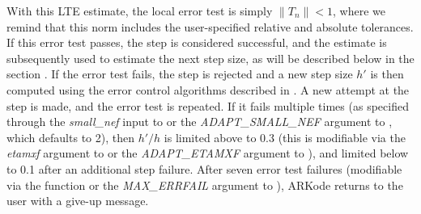 \documentclass[letterpaper,10pt,english]{sphinxmanual}
\begin{document}
With this LTE estimate, the local error test is simply \(\|T_n\|
< 1\), where we remind that this norm includes the user-specified
relative and absolute tolerances.  If this error test passes, the step
is considered successful, and the estimate is subsequently used to
estimate the next step size, as will be described below in the section
{\hyperref[Mathematics:mathematics-adaptivity-errorcontrol]{\emph{}}}.  If the error test fails,
the step is rejected and a new step size \(h'\) is then computed
using the error control algorithms described in
{\hyperref[Mathematics:mathematics-adaptivity-errorcontrol]{\emph{}}}.  A new attempt at the step
is made, and the error test is repeated.  If it fails multiple times
(as specified through the \emph{small\_nef} input to
{\hyperref[c_interface/User_callable:c.ARKodeSetSmallNumEFails]{\emph{}}} or the \emph{ADAPT\_SMALL\_NEF} argument
to {\hyperref[f_interface/Usage:f/_/FARKSETIIN]{\emph{}}}, which defaults to 2), then
\(h'/h\) is limited above to 0.3 (this is modifiable via the
\emph{etamxf} argument to {\hyperref[c_interface/User_callable:c.ARKodeSetMaxEFailGrowth]{\emph{}}} or the
\emph{ADAPT\_ETAMXF} argument to {\hyperref[f_interface/Usage:f/_/FARKSETRIN]{\emph{}}}), and
limited below to 0.1 after an additional step failure.  After
seven error test failures (modifiable via the function
{\hyperref[c_interface/User_callable:c.ARKodeSetMaxErrTestFails]{\emph{}}} or the \emph{MAX\_ERRFAIL} argument to
{\hyperref[f_interface/Usage:f/_/FARKSETIIN]{\emph{}}}), ARKode returns to the user with a give-up
message.
\end{document}
